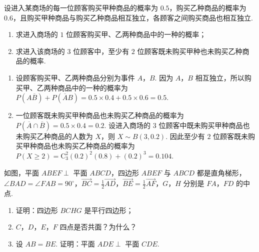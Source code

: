 \begin{problem}
设进入某商场的每一位顾客购买甲种商品的概率为 \(0.5\)，购买乙种商品的概率为 \(0.6\)，且购买甲种商品与购买乙种商品相互独立，各顾客之间购买商品也相互独立.

\begin{enumerate}
\item 求进入商场的 \(1\) 位顾客购买甲、乙两种商品中的一种的概率；
\item 求进入该商场的 \(3\) 位顾客中，至少有 \(2\) 位顾客既未购买甲种也未购买乙种商品的概率.
\end{enumerate}
\end{problem}

\begin{solution}
\begin{enumerate}
\item 设顾客购买甲、乙两种商品分别为事件 \(A\)，\(B\). 因为 \(A\)，\(B\) 相互独立，所以购买甲、乙两种商品中的一种的概率为 \(P(A\overline{B})+P(\overline{A}B)=0.5\times0.4+0.5\times0.6=0.5\).
    \item 一位顾客既未购买甲种商品也未购买乙种商品的概率为 \(P(\overline{A}\cap\overline{B})=0.5\times0.4=0.2\). 设进入商场的 \(3\) 位顾客中既未购买甲种商品也未购买乙种商品的人数为 \(X\)，则 \(X\sim B(3,0.2)\). 因此至少有 \(2\) 位顾客既未购买甲种商品也未购买乙种商品的概率为 \(P(X\geqslant2)=\mathrm C_3^2(0.2)^{2}(0.8)+(0.2)^{3}=0.104\).
\end{enumerate}
\end{solution}

\begin{problem}
如图，平面 \(ABEF \perp\) 平面 \(ABCD\)，四边形 \(ABEF\) 与 \(ABCD\) 都是直角梯形，\(\angle BAD = \angle FAB = 90^{\circ}\)，\(\overrightarrow{BC}=\frac{1}{2}\overrightarrow{AD}\)，\(\overrightarrow{BE}=\frac{1}{2}\overrightarrow{AF}\)，\(G\)，\(H\) 分别是 \(FA\)，\(FD\) 的中点.

\begin{enumerate}
\item 证明：四边形 \(BCHG\) 是平行四边形；
\item \(C\)，\(D\)，\(E\)，\(F\) 四点是否共面？为什么？
\item 设 \(AB = BE\). 证明：平面 \(ADE \perp\) 平面 \(CDE\).
\end{enumerate}

\end{problem}


